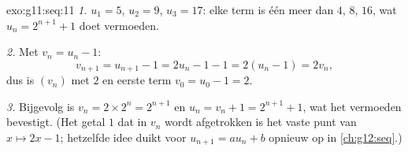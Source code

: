 \begin{solution}{exo:g11:seq:11}
\emph{1.} $u_1 = 5$, $u_2 = 9$, $u_3 = 17$: elke term is één meer dan $4$,
$8$, $16$, wat $u_n = 2^{n+1} + 1$ doet vermoeden.

\emph{2.} Met $v_n = u_n - 1$:
\[
v_{n+1} = u_{n+1} - 1 = 2u_n - 1 - 1 = 2(u_n - 1) = 2v_n,
\]
dus is $(v_n)$  met  $2$ en eerste term $v_0 = u_0 - 1 = 2$.

\emph{3.} Bijgevolg is $v_n = 2 \times 2^n = 2^{n+1}$ en
$u_n = v_n + 1 = 2^{n+1} + 1$, wat het vermoeden bevestigt. (Het getal $1$
dat in $v_n$ wordt afgetrokken is het vaste punt van $x \mapsto 2x - 1$;
hetzelfde idee duikt voor $u_{n+1} = au_n + b$ opnieuw op in
\cref{ch:g12:seq}.)
\end{solution}

